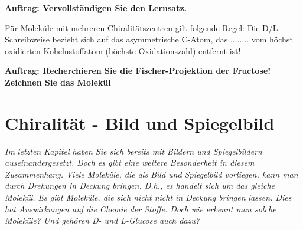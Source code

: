 \documentclass{scrartcl}  %
\begin{document}
			\noindent \textbf{Auftrag: Vervollständigen Sie den Lernsatz.}
			
\vspace{0.3cm}
			{\selectfont  %
			\begin{tcolorbox}[enhanced,
				colback=white,
				colframe=teal,
				fonttitle=\sffamily\bfseries\large, 
				title=Merksatz zu Enantiomeren, 
				attach boxed title to top left={xshift=3.2mm,yshift=-0.50mm},
				boxed title style={skin=enhancedfirst jigsaw,size=small,arc=1mm,bottom=-1mm,colframe=teal,height=0.6cm},
				colbacktitle=teal,
				drop lifted shadow]
				
				Für Moleküle mit mehreren Chiralitätszentren gilt folgende Regel: Die D/L-Schreibweise bezieht sich auf das asymmetrische C-Atom, das ........ vom höchst oxidierten Kohelnstoffatom (höchste Oxidationszahl) entfernt ist!
			\end{tcolorbox}
			}  %
			
\vspace{0.3cm}
			\noindent \textbf{Auftrag: Recherchieren Sie die Fischer-Projektion der Fructose! Zeichnen Sie das Molekül}

\newpage
	\section{Chiralität - Bild und Spiegelbild}
	
		\textit{Im letzten Kapitel haben Sie sich bereits mit Bildern und Spiegelbildern auseinandergesetzt. Doch es gibt eine weitere Besonderheit in diesem Zusammenhang. Viele Moleküle, die als Bild und Spiegelbild vorliegen, kann man durch Drehungen in Deckung bringen. D.h., es handelt sich um das gleiche Molekül. Es gibt Moleküle, die sich nicht nicht in Deckung bringen lassen. Dies hat Auswirkungen auf die Chemie der Stoffe. Doch wie erkennt man solche Moleküle? Und gehören D- und L-Glucose auch dazu?} \newline
\end{document}
